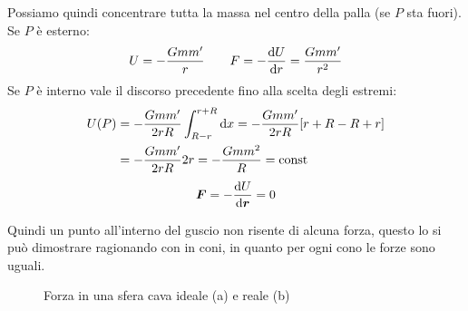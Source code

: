 Possiamo quindi concentrare tutta la massa nel centro della palla (se $P$ sta fuori).
Se $P$ è esterno: $$U=-\frac{Gmm'}{r}\qquad F=-\frac{\mathrm{d} U}{\mathrm{d}
r}=\frac{Gmm'}{r^2}$$
Se $P$ è interno vale il discorso precedente fino alla scelta degli
estremi:
\begin{align*}
U(P)&=-\frac{Gmm'}{2rR}\int_{R-r}^{r+R}\mathrm{d} x=-\frac{Gmm'}{2rR}[r+R-R+r]\\
&=-\frac{Gmm'}{2rR}2r=-\frac{Gmm^2}{R}=\text{const}
\end{align*}
\begin{equation*}\boldsymbol{F}=-\frac{\mathrm{d} U}{\mathrm{d} \boldsymbol{r}}=0\end{equation*}

Quindi un punto all'interno del guscio non risente di alcuna
forza, questo lo si può dimostrare ragionando con in coni, in
quanto per ogni cono le forze sono uguali.

\begin{figure}[htbp]
\centering
{}\quad
{}
\caption{Forza in una sfera cava ideale (a) e reale (b)}
\end{figure}

